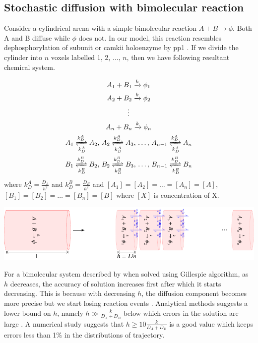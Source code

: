 \documentclass[9pt,lineno,doublespacing]{elife}
\begin{document}
\begin{appendixbox}
\subsection*{Stochastic diffusion with bimolecular reaction}\label{subsec:rdme}

Consider a cylindrical arena with a simple bimolecular reaction $A+B \rightarrow \phi$.
Both A and B diffuse while $\phi$ does not. In our model, this reaction
resembles dephosphorylation of subunit or \gls{camkii} holoenzyme by \gls{pp1} .
If we divide the cylinder into $n$ voxels labelled 1, 2, $\ldots$, $n$, then we
have following resultant chemical system.

\begin{equation}
    \begin{gathered}
        A_1 + B_1 \xrightarrow{k} \phi_1 \\
        A_2 + B_2 \xrightarrow{k} \phi_2 \\
        \vdots \\
        A_n + B_n \xrightarrow{k} \phi_n \\
        A_1 \xrightleftharpoons[k_D^A]{k_D^A} A_2 ,\, A_2 \xrightleftharpoons[k_D^A]{k_D^A} A_3 
            ,\, \ldots,\, A_{n-1} \xrightleftharpoons[k_D^A]{k_D^A} A_n \\ 
        B_1 \xrightleftharpoons[k_D^B]{k_D^B} B_2 ,\, 
            B_2 \xrightleftharpoons[k_D^B]{k_D^B} B_3 ,\, 
            \ldots,\, B_{n-1} \xrightleftharpoons[k_D^B]{k_D^B} B_n \\ 
    \end{gathered}
    \label{eq:discrete}
\end{equation} where $k_D^A=\frac{D_A}{h^2}$ and $k_D^B=\frac{D_B}{h^2}$ and
$[A_1]=[A_2]=\ldots=[A_n]=[A]$, $[B_1]=[B_2]=\ldots=[B_n]=[B]$ where $[X]$ is
concentration of X.

\begin{center}
\includegraphics[width=0.8\linewidth]{./PaperFigures/suppl/figure_diff.pdf}
\end{center}

For a bimolecular system described by  when solved using Gillespie
algorithm, as $h$ decreases, the accuracy of solution increases first after
which it starts decreasing. This is because with decreasing $h$, the diffusion
component becomes more precise but we start losing reaction events
\citep{gardiner_correlations_1976}. Analytical methods suggests a lower bound on
$h$, namely $h\gg \frac{k}{D_A+D_B}$ below which errors in the solution are
large \citep{isaacson_reaction-diffusion_2009}. A numerical study
\citep{erban_stochastic_2009} suggests that $h\ge 10\frac{k}{D_A+D_B}$ is a good
value which keeps errors less than 1\% in the distributions of trajectory.


\end{appendixbox}
\end{document}
